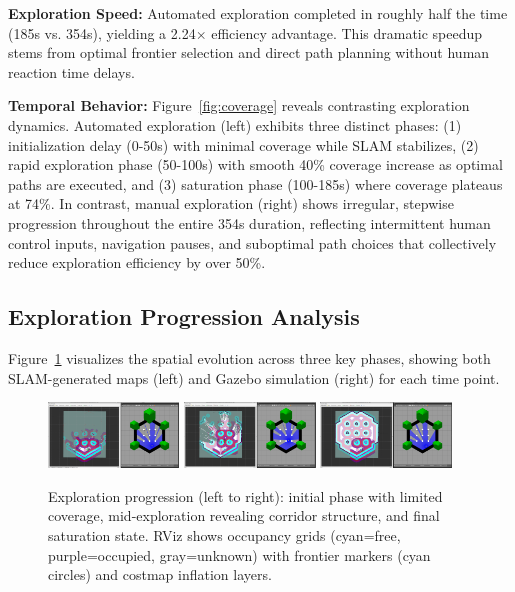 \documentclass[conference]{IEEEtran}
\begin{document}
\textbf{Exploration Speed:} Automated exploration completed in roughly half the time (185s vs. 354s), yielding a 2.24$\times$ efficiency advantage. This dramatic speedup stems from optimal frontier selection and direct path planning without human reaction time delays.

\textbf{Temporal Behavior:} Figure~\ref{fig:coverage} reveals contrasting exploration dynamics. Automated exploration (left) exhibits three distinct phases: (1) initialization delay (0-50s) with minimal coverage while SLAM stabilizes, (2) rapid exploration phase (50-100s) with smooth 40\% coverage increase as optimal paths are executed, and (3) saturation phase (100-185s) where coverage plateaus at 74\%. In contrast, manual exploration (right) shows irregular, stepwise progression throughout the entire 354s duration, reflecting intermittent human control inputs, navigation pauses, and suboptimal path choices that collectively reduce exploration efficiency by over 50\%.

\subsection{Exploration Progression Analysis}

Figure~\ref{fig:progression} visualizes the spatial evolution across three key phases, showing both SLAM-generated maps (left) and Gazebo simulation (right) for each time point.

\begin{figure}[t]
\centering
\includegraphics[width=0.31\textwidth]{figures/Progress_1of6.png}\hfill
\includegraphics[width=0.31\textwidth]{figures/Progress_3of6.png}\hfill
\includegraphics[width=0.31\textwidth]{figures/Progress_6of6.png}
\caption{Exploration progression (left to right): initial phase with limited coverage, mid-exploration revealing corridor structure, and final saturation state. RViz shows occupancy grids (cyan=free, purple=occupied, gray=unknown) with frontier markers (cyan circles) and costmap inflation layers.}
\label{fig:progression}
\end{figure}
\end{document}
